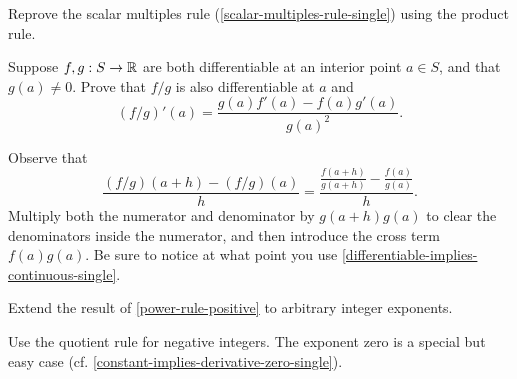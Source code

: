 \begin{exercise}
	 Reprove the scalar multiples rule (\cref{scalar-multiples-rule-single}) using the product rule. 
\end{exercise}

\begin{exercise} \label{quotient-rule-single} 
	Suppose $f, g : S \to \mathbb{R}$ are both differentiable at an interior point $a \in S$, and that $g(a) \neq 0$. Prove that $f/g$ is also differentiable at $a$ and 
	\[ (f/g)'(a) = \frac{g(a)f'(a) - f(a)g'(a)}{g(a)^2}. \] 
	\begin{hint} Observe that \[ \frac{(f/g)(a+h)-(f/g)(a)}{h} = \frac{\frac{f(a+h)}{g(a+h)} - \frac{f(a)}{g(a)} }{h}. \]
	Multiply both the numerator and denominator by $g(a+h)g(a)$ to clear the denominators inside the numerator, and then introduce the cross term $f(a)g(a)$. Be sure to notice at what point you use \cref{differentiable-implies-continuous-single}.
	\end{hint}
\end{exercise}

\begin{exercise} \label{power-rule-integer} 
	Extend the result of \cref{power-rule-positive} to arbitrary integer exponents. 
	\begin{hint} Use the quotient rule for negative integers. The exponent zero is a special but easy case (cf. \cref{constant-implies-derivative-zero-single}).  
	\end{hint}
\end{exercise}

